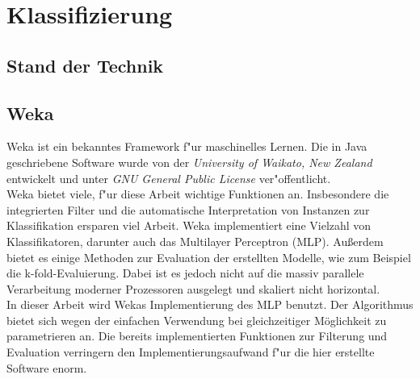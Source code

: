 \section{Klassifizierung}
\label{Klassifizierung}

\subsection{Stand der Technik}
\label{Stand der Technik}

\subsection{Weka}
\label{Weka}
Weka ist ein bekanntes Framework f"ur maschinelles Lernen. Die in Java geschriebene Software wurde von der \textit{University of Waikato, New Zealand} entwickelt und unter \textit{GNU General Public License} ver"offentlicht. \\
Weka bietet viele, f"ur diese Arbeit wichtige Funktionen an. Insbesondere die integrierten Filter und die automatische Interpretation von Instanzen zur Klassifikation ersparen viel Arbeit. Weka implementiert eine Vielzahl von Klassifikatoren, darunter auch das Multilayer Perceptron (MLP).
Au{\ss}erdem bietet es einige Methoden zur Evaluation der erstellten Modelle, wie zum Beispiel die k-fold-Evaluierung. Dabei ist es jedoch nicht auf die massiv parallele Verarbeitung moderner Prozessoren ausgelegt und skaliert nicht horizontal.\\
In dieser Arbeit wird Wekas Implementierung des MLP benutzt. Der Algorithmus bietet sich wegen der einfachen Verwendung bei gleichzeitiger Möglichkeit zu parametrieren an. Die bereits implementierten  Funktionen zur Filterung und Evaluation verringern den Implementierungsaufwand f"ur die hier erstellte Software enorm.

